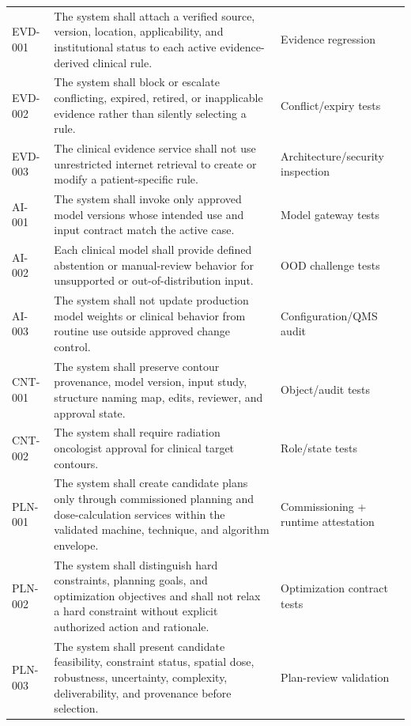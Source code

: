 \documentclass[11pt,letterpaper]{article}
\begin{document}
\begin{small}
\begin{longtable}{@{}L{0.1032\textwidth}L{0.6723\textwidth}L{0.1445\textwidth}@{}}
\addlinespace[2pt]
EVD-001 & The system shall attach a verified source, version, location, applicability, and institutional status to each active evidence-derived clinical rule. & Evidence regression \\
\addlinespace[2pt]
EVD-002 & The system shall block or escalate conflicting, expired, retired, or inapplicable evidence rather than silently selecting a rule. & Conflict\slash\allowbreak{}expiry tests \\
\addlinespace[2pt]
EVD-003 & The clinical evidence service shall not use unrestricted internet retrieval to create or modify a patient-specific rule. & Architecture\slash\allowbreak{}security inspection \\
\addlinespace[2pt]
AI-001 & The system shall invoke only approved model versions whose intended use and input contract match the active case. & Model gateway tests \\
\addlinespace[2pt]
AI-002 & Each clinical model shall provide defined abstention or manual-review behavior for unsupported or out-of-distribution input. & OOD challenge tests \\
\addlinespace[2pt]
AI-003 & The system shall not update production model weights or clinical behavior from routine use outside approved change control. & Configuration\slash\allowbreak{}QMS audit \\
\addlinespace[2pt]
CNT-001 & The system shall preserve contour provenance, model version, input study, structure naming map, edits, reviewer, and approval state. & Object\slash\allowbreak{}audit tests \\
\addlinespace[2pt]
CNT-002 & The system shall require radiation oncologist approval for clinical target contours. & Role\slash\allowbreak{}state tests \\
\addlinespace[2pt]
PLN-001 & The system shall create candidate plans only through commissioned planning and dose-calculation services within the validated machine, technique, and algorithm envelope. & Commissioning + runtime attestation \\
\addlinespace[2pt]
PLN-002 & The system shall distinguish hard constraints, planning goals, and optimization objectives and shall not relax a hard constraint without explicit authorized action and rationale. & Optimization contract tests \\
\addlinespace[2pt]
PLN-003 & The system shall present candidate feasibility, constraint status, spatial dose, robustness, uncertainty, complexity, deliverability, and provenance before selection. & Plan-review validation \\

\end{longtable}
\end{small}
\end{document}
